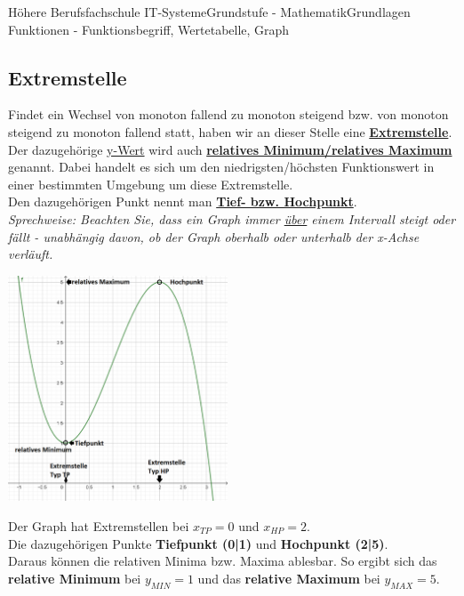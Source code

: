 \documentclass[11pt,twocolumn,oneside,openany,headings=optiontotoc,11pt,numbers=noenddot]{article}
\begin{document}
\begin{worksheet}{Höhere Berufsfachschule IT-Systeme}{Grundstufe - Mathematik}{Grundlagen Funktionen - Funktionsbegriff, Wertetabelle, Graph}
		\subsection*{Extremstelle}
		Findet ein Wechsel von monoton fallend zu monoton steigend bzw. von monoton steigend zu monoton fallend statt, haben wir an dieser Stelle eine \underline{\textbf{Extremstelle}}.\\
		Der dazugehörige \underline{y-Wert} wird auch \underline{\textbf{relatives Minimum/relatives Maximum}} genannt. Dabei handelt es sich um den niedrigsten/höchsten Funktionswert in einer bestimmten Umgebung um diese Extremstelle.\\
		Den dazugehörigen Punkt nennt man \textbf{\underline{Tief- bzw. Hochpunkt}}.\\
		\textit{Sprechweise: Beachten Sie, dass ein Graph immer \underline{über} einem Intervall steigt oder fällt - unabhängig davon, ob der Graph oberhalb oder unterhalb der x-Achse verläuft.}\\
		\par\bigskip\noindent
		\includegraphics[width=0.49\textwidth]{../99_Bilder/EP.png}\\
		\par\bigskip\noindent
		Der Graph hat Extremstellen bei \(x_{TP} = 0\) und \(x_{HP} = 2\).\\
		Die dazugehörigen Punkte \textbf{Tiefpunkt (0|1)} und \textbf{Hochpunkt (2|5)}.\\
		Daraus können die relativen Minima bzw. Maxima ablesbar. So ergibt sich das \textbf{relative Minimum} bei \( y_{MIN} = 1\) und das \textbf{relative Maximum} bei \(y_{MAX} = 5\).

\end{worksheet}
\end{document}
